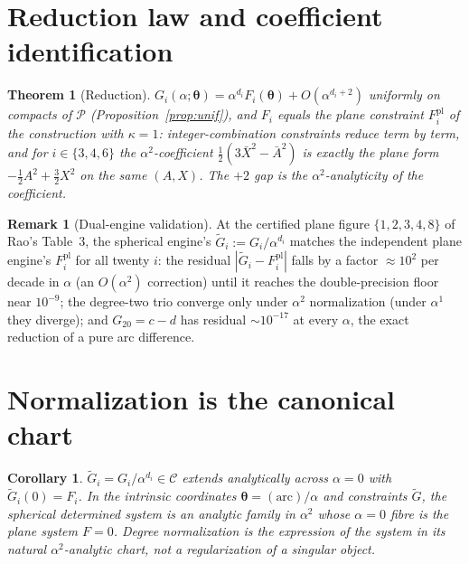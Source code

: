 \documentclass[11pt]{article}
\newtheorem{theorem}{Theorem}\newtheorem{lemma}{Lemma}
\newtheorem{corollary}{Corollary}\newtheorem{proposition}{Proposition}
\theoremstyle{definition}\newtheorem{definition}{Definition}\newtheorem{remark}{Remark}
\begin{document}
\section{Reduction law and coefficient identification}
\begin{theorem}[Reduction]\label{thm:red}
$G_i(\alpha;\boldsymbol\theta)=\alpha^{d_i}F_i(\boldsymbol\theta)+O(\alpha^{d_i+2})$
uniformly on compacts of $\mathcal P$ (Proposition~\ref{prop:unif}), and $F_i$ equals the plane constraint
$F_i^{\mathrm{pl}}$ of the construction with $\kappa=1$: integer-combination
constraints reduce term by term, and for $i\in\{3,4,6\}$ the $\alpha^2$-coefficient
$\tfrac12(3\bar X^2-\bar A^2)$ is exactly the plane form $-\tfrac12A^2+\tfrac32X^2$
on the same $(A,X)$. The $+2$ gap is the $\alpha^2$-analyticity of the coefficient.
\end{theorem}
\begin{remark}[Dual-engine validation]
At the certified plane figure $\{1,2,3,4,8\}$ of Rao's Table~3, the spherical engine's
$\widetilde G_i:=G_i/\alpha^{d_i}$ matches the independent plane engine's $F_i^{\mathrm{pl}}$
for all twenty $i$: the residual $|\widetilde G_i-F_i^{\mathrm{pl}}|$ falls by a factor
$\approx10^2$ per decade in $\alpha$ (an $O(\alpha^2)$ correction) until it reaches the
double-precision floor near $10^{-9}$; the degree-two trio converge only under
$\alpha^2$ normalization (under $\alpha^1$ they diverge); and $G_{20}=c-d$ has residual
$\sim10^{-17}$ at every $\alpha$, the exact reduction of a pure arc difference.
\end{remark}

\section{Normalization is the canonical chart}
\begin{corollary}\label{cor:chart}
$\widetilde G_i=G_i/\alpha^{d_i}\in\mathcal C$ extends analytically across $\alpha=0$
with $\widetilde G_i(0)=F_i$. In the intrinsic coordinates
$\boldsymbol\theta=(\text{arc})/\alpha$ and constraints $\widetilde G$, the spherical
determined system is an analytic family in $\alpha^2$ whose $\alpha=0$ fibre is the
plane system $F=0$. Degree normalization is the expression of the system in its natural
$\alpha^2$-analytic chart, not a regularization of a singular object.
\end{corollary}
\end{document}
